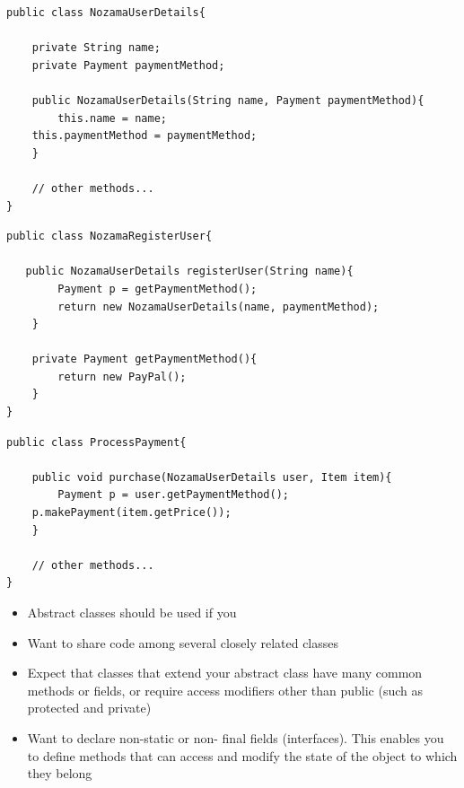 \documentclass{beamer}
\begin{document}
\begin{frame}[fragile]
\begin{block}{}
\begin{lstlisting}
public class NozamaUserDetails{
    
    private String name;
    private Payment paymentMethod;
    
    public NozamaUserDetails(String name, Payment paymentMethod){
    	this.name = name;
	this.paymentMethod = paymentMethod;
    }
    
    // other methods...
}
\end{lstlisting}
\end{block}
\end{frame}

\begin{frame}[fragile]
\begin{block}{}
\begin{lstlisting}
public class NozamaRegisterUser{
    
   public NozamaUserDetails registerUser(String name){
        Payment p = getPaymentMethod();
        return new NozamaUserDetails(name, paymentMethod);
    }
    
    private Payment getPaymentMethod(){
    	return new PayPal();
    }
}
\end{lstlisting}
\end{block}
\end{frame}

\begin{frame}[fragile]
\begin{block}{}
\begin{lstlisting}
public class ProcessPayment{
       
    public void purchase(NozamaUserDetails user, Item item){
    	Payment p = user.getPaymentMethod();
	p.makePayment(item.getPrice());
    }
    
    // other methods...
}
\end{lstlisting}
\end{block}
\end{frame}

\begin{frame}
\begin{itemize}
\item Abstract classes should be used if you
\bigskip
\item Want to share code among several closely related classes
\item Expect that classes that extend your abstract class have many common methods or  fields, or require access modifiers other than public (such as protected and private)
\item Want to declare non-static or non- final fields (interfaces).  This enables you to define methods that can access and modify the state of the object to which they belong
\end{itemize}
\end{frame}
\end{document}
